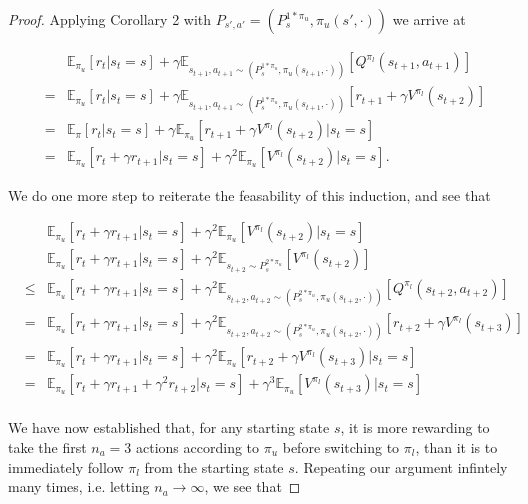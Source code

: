 \documentclass[11pt]{article} %
\begin{document}
\begin{proof}
	Applying Corollary 2 with $P_{s',a'} = (P_s^{1 * \pi_u}, \pi_u(s',\cdot))$  we arrive at
	
	\[
		\begin{array}{rll}
			& & \mathbb{E}_{\pi_u}[r_t | s_t = s] + \gamma \mathbb{E}_{s_{t+1},a_{t+1} \sim (P_s^{1 * \pi_u}, \pi_u(s_{t+1},\cdot))}[Q^{\pi_l}(s_{t+1},a_{t+1})] \\
				 & = & \mathbb{E}_{\pi_u}[r_t | s_t = s] + \gamma \mathbb{E}_{s_{t+1},a_{t+1} \sim (P_s^{1 * \pi_u}, \pi_u(s_{t+1},\cdot))}[r_{t+1} + \gamma V^{\pi_l}(s_{t+2})] \\
				 & = & \mathbb{E}_{\pi}[r_t | s_t = s] + \gamma \mathbb{E}_{\pi_u}[r_{t+1} + \gamma V^{\pi_l}(s_{t+2}) | s_t = s] \\
				& = & \mathbb{E}_{\pi_u}[r_t + \gamma r_{t+1} | s_t = s] + \gamma^2 \mathbb{E}_{\pi_u}[V^{\pi_l}(s_{t+2}) | s_t = s].
		\end{array}
	\]

	We do one more step to reiterate the feasability of this induction, and see that

	\[
		\begin{array}{rll}
			& & \mathbb{E}_{\pi_u}[r_t + \gamma r_{t+1} | s_t = s] + \gamma^2 \mathbb{E}_{\pi_u}[V^{\pi_l}(s_{t+2}) | s_t = s] \\
			& & \mathbb{E}_{\pi_u}[r_t + \gamma r_{t+1} | s_t = s] + \gamma^2 \mathbb{E}_{s_{t+2} \sim P_s^{2 * \pi_u}}[V^{\pi_l}(s_{t+2})] \\
			& \le & \mathbb{E}_{\pi_u}[r_t + \gamma r_{t+1} | s_t = s] + \gamma^2 \mathbb{E}_{s_{t+2},a_{t+2} \sim (P_s^{2 * \pi_u},\pi_u(s_{t+2},\cdot))} [Q^{\pi_l}(s_{t+2},a_{t+2})] \\
			& = & \mathbb{E}_{\pi_u}[r_t + \gamma r_{t+1} | s_t = s] + \gamma^2 \mathbb{E}_{s_{t+2},a_{t+2} \sim (P_s^{2 * \pi_u},\pi_u(s_{t+2},\cdot))} [r_{t+2} + \gamma V^{\pi_l}(s_{t+3})] \\
			& = & \mathbb{E}_{\pi_u}[r_t + \gamma r_{t+1} | s_t = s] + \gamma^2 \mathbb{E}_{\pi_u} [r_{t+2} + \gamma V^{\pi_l}(s_{t+3}) | s_t = s] \\
			& = & \mathbb{E}_{\pi_u}[r_t + \gamma r_{t+1} + \gamma^2 r_{t+2} | s_t = s] + \gamma^3 \mathbb{E}_{\pi_u} [V^{\pi_l}(s_{t+3}) | s_t = s] \\
		\end{array}
	\]

	We have now established that, for any starting state $s$, it is more rewarding to take the first $n_a = 3$ actions according to $\pi_u$ 	before switching to $\pi_l$, than it is to immediately follow $\pi_l$ from the starting state $s$. Repeating our argument infintely many times, i.e. letting $n_a 	\rightarrow \infty$, we see that 


\end{proof}
\end{document}
